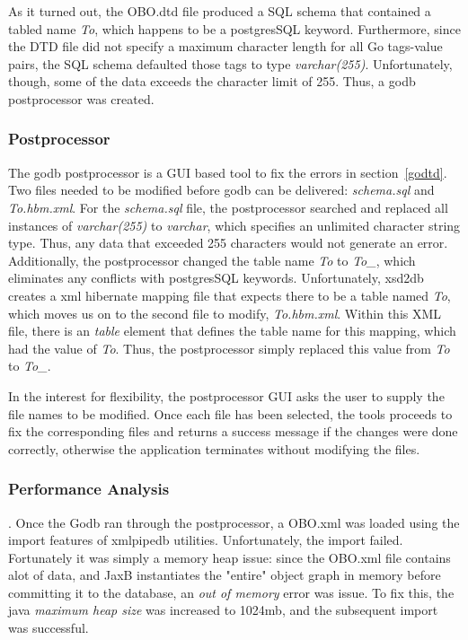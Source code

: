 As it turned out, the OBO.dtd file produced a SQL schema that contained a tabled name \emph{To}, which happens to be
a postgresSQL keyword. Furthermore, since the DTD file did not specify a maximum character length for all Go tags-value
pairs, the SQL schema defaulted those tags to type \emph{varchar(255)}. Unfortunately, though, some of the data exceeds the
character limit of 255. Thus, a godb postprocessor was created.

\subsubsection{Postprocessor}
The godb postprocessor is a GUI based tool to fix the errors in section~\ref{godtd}. Two files needed to be modified  before
godb can be delivered: \emph{schema.sql} and \emph{To.hbm.xml}. For the \emph{schema.sql} file, the postprocessor
searched and replaced all instances of \emph{varchar(255)} to \emph{varchar}, which specifies an unlimited character string type.
Thus, any data that exceeded 255 characters would not generate an error. Additionally,
the postprocessor changed the table name \emph{To} to  \emph{To\_}, which eliminates any conflicts with postgresSQL keywords.
Unfortunately, xsd2db
creates a xml hibernate mapping file that expects there to be a table named \emph{To}, which moves us on to the second file to modify,
\emph{To.hbm.xml}. Within this XML file, there is an \emph{table} element that defines the table name for this mapping, which had the
value of \emph{To}. Thus, the postprocessor simply replaced this value from \emph{To} to \emph{To\_}.

In the interest for flexibility, the postprocessor GUI asks the user to supply the file names to be modified.
Once each file has been selected, the tools proceeds to fix the corresponding files and returns a success message
if the changes were done correctly, otherwise the application terminates without modifying the files.

\subsubsection{Performance Analysis}.
Once the Godb ran through the postprocessor, a OBO.xml was loaded using the import features of xmlpipedb utilities.
Unfortunately, the import failed. Fortunately it was simply a memory heap issue: since the OBO.xml file contains alot of data, and
JaxB instantiates the "entire" object graph in memory before committing it to the database, an \emph{out of memory} error was issue.
To fix this, the java \emph{maximum heap size} was increased to 1024mb, and the subsequent import was successful.

